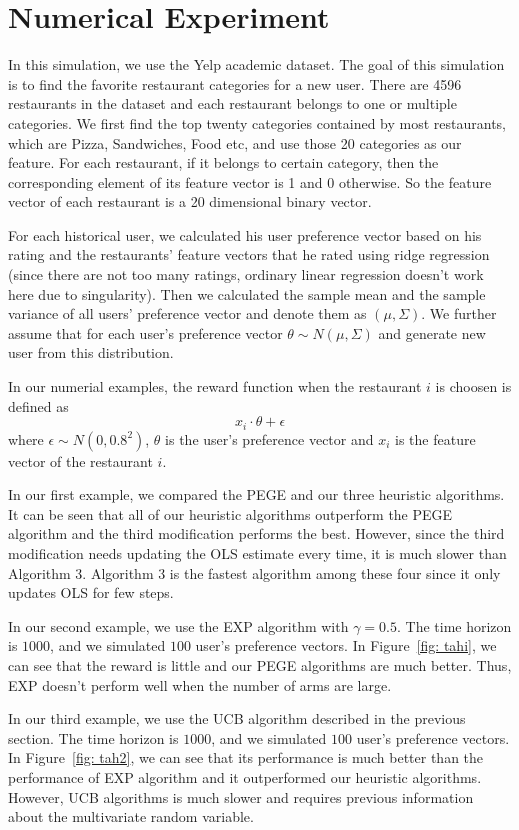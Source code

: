 \documentclass{article}
\theoremstyle{plain}
\theoremstyle{definition}
\begin{document}
\section{Numerical Experiment}
In this simulation, we use the Yelp academic dataset. The goal of this simulation is to find the favorite restaurant categories for a new user. There are 4596 restaurants in the dataset and each restaurant belongs to one or multiple categories. We first find the top twenty categories contained by most restaurants, which are Pizza, Sandwiches, Food etc, and use those 20 categories as our feature. For each restaurant, if it belongs to certain category, then the corresponding element of its feature vector is 1 and 0 otherwise. So the feature vector of each restaurant is a 20 dimensional binary vector. 

For each historical user, we calculated his user preference vector based on his rating and the restaurants' feature vectors that he rated using ridge regression (since there are not too many ratings, ordinary linear regression doesn't work here due to singularity). Then we calculated the sample mean and the sample variance of all users' preference vector and denote them as $(\mu,\Sigma)$. We further assume that for each user's preference vector $\theta\sim N(\mu,\Sigma)$ and generate new user from this distribution.

In our numerial examples, the reward function when the restaurant
$i$ is choosen is defined as 
\[
x_{i}\cdot\theta+\epsilon
\]
where $\epsilon\sim N\left(0,0.8^{2}\right)$, $\theta$ is the user's
preference vector and $x_{i}$ is the feature vector of the restaurant
$i$.

In our first example, we compared the PEGE and our three heuristic algorithms. It can be seen that all of our heuristic algorithms outperform the PEGE algorithm and the third modification performs the best. However, since the third modification needs updating the OLS estimate every time, it is much slower than Algorithm 3. Algorithm 3 is the fastest algorithm among these four since it only updates OLS for few steps.


In our second example, we use the EXP algorithm with $\gamma=0.5$.
The time horizon is $1000$, and we simulated $100$ user's preference
vectors. In Figure~\ref{fig: tahi}, we can see that the reward is little and our PEGE algorithms are much better. Thus, EXP doesn't perform well when the number of arms are large.

In our third example, we use the UCB algorithm described in the previous
section. The time horizon is $1000$, and we simulated $100$ user's
preference vectors.  In Figure~\ref{fig: tah2}, we can see that its performance is much better than the performance of EXP algorithm and it outperformed our heuristic algorithms. However, UCB algorithms is much slower and requires previous information about the multivariate random variable.
\end{document}
